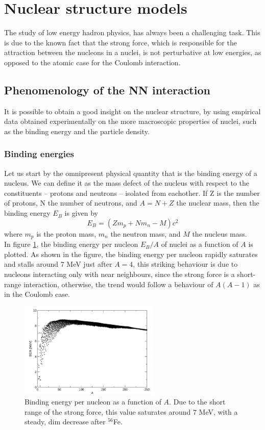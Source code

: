 \section{Nuclear structure models}
\label{sec:models}
The study of low energy hadron physics, has always been a challenging task. This is due to the known fact that the strong force, which is responsible for the attraction between the nucleons in a nuclei, is not perturbative at low energies, as opposed to the atomic case for the Coulomb interaction.
\subsection{Phenomenology of the NN interaction}
It is possible to obtain a good insight on the nuclear structure, by using empirical data obtained experimentally on the more macroscopic properties of nuclei, such as the binding energy and the particle density.
\subsubsection{Binding energies}
Let us start by the omnipresent physical quantity that is the binding energy of a nucleus. We can define it as the mass defect of the nucleus with respect to the constituents -- protons and neutrons -- isolated from eachother. If Z is the number of protons, N the number of neutrons, and $A=N+Z$ the nuclear mass, then the binding energy $E_B$ is given by
\begin{equation}
    \label{eq:binding_energy}
    E_B = (Zm_p + Nm_n - M)c^2
\end{equation}
where $m_p$ is the proton mass, $m_n$ the neutron mass, and $M$ the nucleus mass.
\\In figure \ref{fig:BE}, the binding energy per nucleon $E_B/A$ of nuclei as a function of $A$ is plotted. As shown in the figure, the binding energy per nucleon rapidly saturates and stalls around $7$ MeV just after $A=4$, this striking behaviour is due to nucleons interacting only with near neighbours, since the strong force is a short-range interaction, otherwise, the trend would follow a behaviour of $A(A-1)$ as in the Coulomb case.
\begin{figure}[H]
    \centering
    \includegraphics[width=0.6\textwidth]{Images/BE.png}
    \caption{Binding energy per nucleon as a function of $A$. Due to the short range of the strong force, this value saturates around $7$ MeV, with a steady, dim decrease after $^{56}$Fe.}
    \label{fig:BE}
\end{figure}
